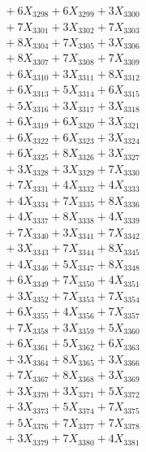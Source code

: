 \documentclass[a4paper,10pt]{article}
\begin{document}
{\begin{align}
&\;  + 6 X_{3298} + 6 X_{3299} + 3 X_{3300} \\[0.3ex]
&\;  + 7 X_{3301} + 3 X_{3302} + 7 X_{3303} \\[0.3ex]
&\;  + 8 X_{3304} + 7 X_{3305} + 3 X_{3306} \\[0.3ex]
&\;  + 8 X_{3307} + 7 X_{3308} + 7 X_{3309} \\[0.5ex]\allowbreak
&\;  + 6 X_{3310} + 3 X_{3311} + 8 X_{3312} \\[0.3ex]
&\;  + 6 X_{3313} + 5 X_{3314} + 6 X_{3315} \\[0.3ex]
&\;  + 5 X_{3316} + 3 X_{3317} + 3 X_{3318} \\[0.3ex]
&\;  + 6 X_{3319} + 6 X_{3320} + 3 X_{3321} \\[0.3ex]
&\;  + 6 X_{3322} + 6 X_{3323} + 3 X_{3324} \\[0.3ex]
&\;  + 6 X_{3325} + 8 X_{3326} + 3 X_{3327} \\[0.3ex]
&\;  + 3 X_{3328} + 3 X_{3329} + 7 X_{3330} \\[0.3ex]
&\;  + 7 X_{3331} + 4 X_{3332} + 4 X_{3333} \\[0.3ex]
&\;  + 4 X_{3334} + 7 X_{3335} + 8 X_{3336} \\[0.3ex]
&\;  + 4 X_{3337} + 8 X_{3338} + 4 X_{3339} \\[0.5ex]\allowbreak
&\;  + 7 X_{3340} + 3 X_{3341} + 7 X_{3342} \\[0.3ex]
&\;  + 3 X_{3343} + 7 X_{3344} + 8 X_{3345} \\[0.3ex]
&\;  + 4 X_{3346} + 5 X_{3347} + 8 X_{3348} \\[0.3ex]
&\;  + 6 X_{3349} + 7 X_{3350} + 4 X_{3351} \\[0.3ex]
&\;  + 3 X_{3352} + 7 X_{3353} + 7 X_{3354} \\[0.3ex]
&\;  + 6 X_{3355} + 4 X_{3356} + 7 X_{3357} \\[0.3ex]
&\;  + 7 X_{3358} + 3 X_{3359} + 5 X_{3360} \\[0.3ex]
&\;  + 6 X_{3361} + 5 X_{3362} + 6 X_{3363} \\[0.3ex]
&\;  + 3 X_{3364} + 8 X_{3365} + 3 X_{3366} \\[0.3ex]
&\;  + 7 X_{3367} + 8 X_{3368} + 3 X_{3369} \\[0.5ex]\allowbreak
&\;  + 3 X_{3370} + 3 X_{3371} + 5 X_{3372} \\[0.3ex]
&\;  + 3 X_{3373} + 5 X_{3374} + 7 X_{3375} \\[0.3ex]
&\;  + 5 X_{3376} + 7 X_{3377} + 7 X_{3378} \\[0.3ex]
&\;  + 3 X_{3379} + 7 X_{3380} + 4 X_{3381} \\[0.3ex]

\end{align}}
\end{document}
